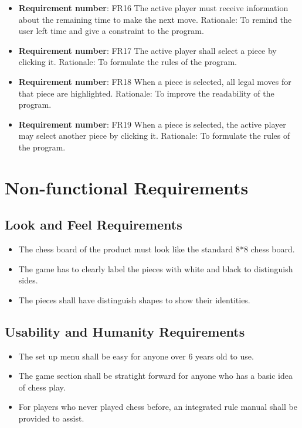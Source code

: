 \documentclass[12pt, titlepage]{article}
\begin{document}
\begin{itemize}
\item \textbf{Requirement number}: FR16\newline
The active player must receive information about the remaining time to make the next move.\newline
Rationale:  To remind the user left time and give a constraint to the program.
 
\item \textbf{Requirement number}: FR17\newline
The active player shall select a piece by clicking it. \newline
Rationale: To formulate the rules of the program.
 
\item \textbf{Requirement number}: FR18\newline
When a piece is selected, all legal moves for that piece are highlighted. \newline
Rationale: To improve the readability of the program.
 
\item \textbf{Requirement number}: FR19\newline
When a piece is selected, the active player may select another piece by clicking it. \newline
Rationale: To formulate the rules of the program.
\end{itemize}


\section{Non-functional Requirements}

\subsection{Look and Feel Requirements}
\begin{itemize}
\item The chess board of the product must look like the standard 8*8 chess board.
\item The game has to clearly label the pieces with white and black to distinguish sides.
\item The pieces shall have distinguish shapes to show their identities.
\end{itemize}

\subsection{Usability and Humanity Requirements}
\begin{itemize}
\item The set up menu shall be easy for anyone over 6 years old to use.
\item The game section shall be stratight forward for anyone who has a basic idea of chess play.
\item For players who never played chess before, an integrated rule manual shall be provided to assist.
\end{itemize}
\end{document}

